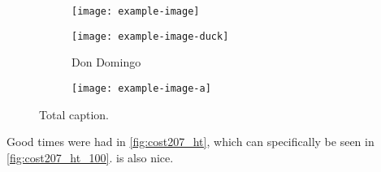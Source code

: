 \documentclass{article}
\begin{document}
	
\begin{figure}
	\centering
	\begin{subfigure}[b]{0.49\linewidth} 
		\centering\texttt{[image: example-image]} 
		\caption{} \label{fig:total_a}
	\end{subfigure}
	\begin{subfigure}[b]{0.49\linewidth} 
		\centering\texttt{[image: example-image-duck]} 
		\caption{Don Domingo} \label{fig:total_b}
	\end{subfigure}
	\begin{subfigure}[b]{0.49\linewidth} 
		\texttt{[image: example-image-a]} 
		\caption{} \label{fig:total_c}
	\end{subfigure} 
	\caption{Total caption.} 
	\label{fig:total}
\end{figure} 

Good times were had in \cref{fig:cost207_ht}, which can specifically be seen in \cref{fig:cost207_ht_100}.  is also nice.
\end{document}
